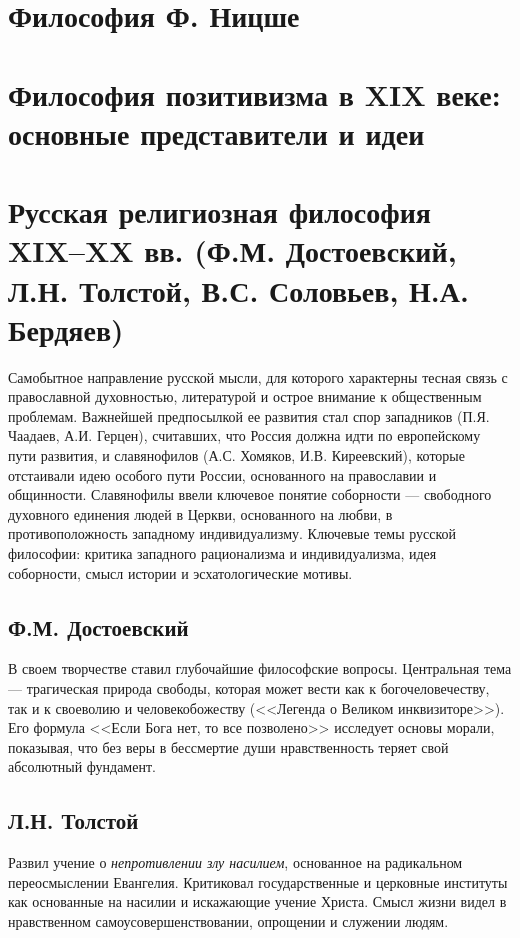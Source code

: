 \documentclass[12pt,a4paper]{article}
\begin{document}
	\section{Философия Ф. Ницше}
	
	\section{Философия позитивизма в XIX веке: основные представители и идеи}
	
	\section{Русская религиозная философия XIX–XX вв. (Ф.М. Достоевский, Л.Н. Толстой, В.С. Соловьев, Н.А. Бердяев)~\checkmark}
	
	Самобытное направление русской мысли, для которого характерны тесная связь с православной духовностью, литературой и острое внимание к общественным проблемам. Важнейшей предпосылкой ее развития стал спор западников (П.Я. Чаадаев, А.И. Герцен), считавших, что Россия должна идти по европейскому пути развития, и славянофилов (А.С. Хомяков, И.В. Киреевский), которые отстаивали идею особого пути России, основанного на православии и общинности. Славянофилы ввели ключевое понятие соборности — свободного духовного единения людей в Церкви, основанного на любви, в противоположность западному индивидуализму. Ключевые темы русской философии: критика западного рационализма и индивидуализма, идея соборности, смысл истории и эсхатологические мотивы.
	
	\subsection{Ф.М. Достоевский}
	В своем творчестве ставил глубочайшие философские вопросы. Центральная тема — трагическая природа свободы, которая может вести как к богочеловечеству, так и к своеволию и человекобожеству (<<Легенда о Великом инквизиторе>>). Его формула <<Если Бога нет, то все позволено>> исследует основы морали, показывая, что без веры в бессмертие души нравственность теряет свой абсолютный фундамент.
	
	\subsection{Л.Н. Толстой}
	Развил учение о \textit{непротивлении злу насилием}, основанное на радикальном переосмыслении Евангелия. Критиковал государственные и церковные институты как основанные на насилии и искажающие учение Христа. Смысл жизни видел в нравственном самоусовершенствовании, опрощении и служении людям.
	
\end{document}
